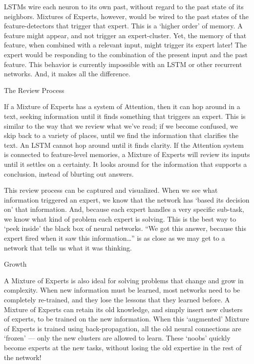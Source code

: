 LSTMs wire each neuron to its own past, without regard to the past state of its neighbors. Mixtures of Experts, however, would be wired to the past states of the feature-detectors that trigger that expert. This is a ‘higher order’ of memory. A feature might appear, and not trigger an expert-cluster. Yet, the memory of that feature, when combined with a relevant input, might trigger its expert later! The expert would be responding to the combination of the present input and the past feature. This behavior is currently impossible with an LSTM or other recurrent networks. And, it makes all the difference.

The Review Process

If a Mixture of Experts has a system of Attention, then it can hop around in a text, seeking information until it finds something that triggers an expert. This is similar to the way that we review what we’ve read; if we become confused, we skip back to a variety of places, until we find the information that clarifies the text. An LSTM cannot hop around until it finds clarity. If the Attention system is connected to feature-level memories, a Mixture of Experts will review its inputs until it settles on a certainty. It looks around for the information that supports a conclusion, instead of blurting out answers.

This review process can be captured and visualized. When we see what information triggered an expert, we know that the network has ‘based its decision on’ that information. And, because each expert handles a very specific sub-task, we know what kind of problem each expert is solving. This is the best way to ‘peek inside’ the black box of neural networks. “We got this answer, because this expert fired when it saw this information…” is as close as we may get to a network that tells us what it was thinking.

Growth

A Mixture of Experts is also ideal for solving problems that change and grow in complexity. When new information must be learned, most networks need to be completely re-trained, and they lose the lessons that they learned before. A Mixture of Experts can retain its old knowledge, and simply insert new clusters of experts, to be trained on the new information. When this ‘augmented’ Mixture of Experts is trained using back-propagation, all the old neural connections are ‘frozen’ — only the new clusters are allowed to learn. These ‘noobs’ quickly become experts at the new tasks, without losing the old expertise in the rest of the network!

